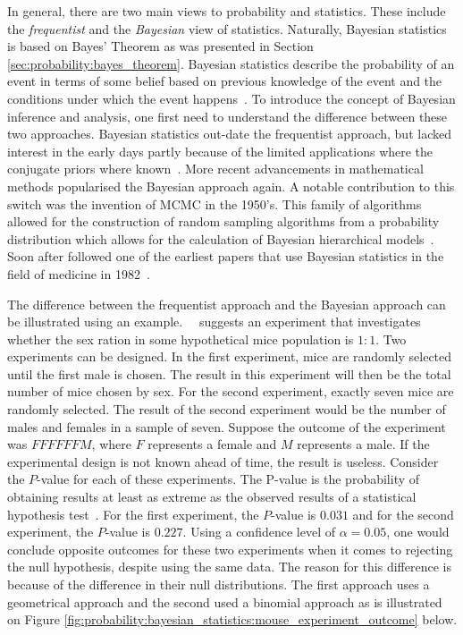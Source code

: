 In general, there are two main views to probability and statistics. These include the \textit{frequentist} and the \textit{Bayesian} view of statistics. Naturally, Bayesian statistics is based on Bayes' Theorem as was presented in Section \ref{sec:probability:bayes_theorem}. Bayesian statistics describe the probability of an event in terms of some belief based on previous knowledge of the event and the conditions under which the event happens~\cite{ref:hackenberger:2019}. To introduce the concept of Bayesian inference and analysis, one first need to understand the difference between these two approaches. Bayesian statistics out-date the frequentist approach, but lacked interest in the early days partly because of the limited applications where the conjugate priors where known~\cite{ref:hackenberger:2019}. More recent advancements in mathematical methods popularised the Bayesian approach again. A notable contribution to this switch was the invention of \ac{MCMC} in the 1950's. This family of algorithms allowed for the construction of random sampling algorithms from a probability distribution which allows for the calculation of Bayesian hierarchical models~\cite{ref:hackenberger:2019}. Soon after followed one of the earliest papers that use Bayesian statistics in the field of medicine in 1982~\cite{ref:ashby:2006}.

The difference between the frequentist approach and the Bayesian approach can be illustrated using an example.~\citeauthor{ref:hackenberger:2019}~\cite{ref:hackenberger:2019} suggests an experiment that investigates whether the sex ration in some hypothetical mice population is $1:1$. Two experiments can be designed. In the first experiment, mice are randomly selected until the first male is chosen. The result in this experiment will then be the total number of mice chosen by sex. For the second experiment, exactly seven mice are randomly selected. The result of the second experiment would be the number of males and females in a sample of seven. Suppose the outcome of the experiment was $FFFFFFM$, where $F$ represents a female and $M$ represents a male. If the experimental design is not known ahead of time, the result is useless. Consider the $P$-value for each of these experiments. The P-value is the probability of obtaining results at least as extreme as the observed results of a statistical hypothesis test~\cite{ref:beers:2022}. For the first experiment, the $P$-value is $0.031$ and for the second experiment, the $P$-value is $0.227$. Using a confidence level of $\alpha = 0.05$, one would conclude opposite outcomes for these two experiments when it comes to rejecting the null hypothesis, despite using the same data. The reason for this difference is because of the difference in their null distributions. The first approach uses a geometrical approach and the second used a binomial approach as is illustrated on Figure \ref{fig:probability:bayesian_statistics:mouse_experiment_outcome} below.


